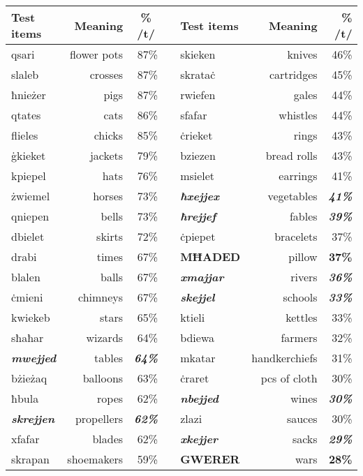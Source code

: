 \documentclass[output=paper]{langsci/langscibook}
\begin{document}
\begin{table}
\small
\begin{tabularx}{\textwidth}{lrr X lrr}
\lsptoprule
\textbf{Test items} & \textbf{Meaning} & \multicolumn{1}{c}{\textbf{\% /t/}} &  & \textbf{Test items} & \textbf{Meaning} & \textbf{\% /t/}\\
\midrule 
qsari & flower pots & 87\% &  & skieken & knives & 46\%\\
slaleb & crosses & 87\% &  & skrata\.c & cartridges & 45\%\\
ħnieżer & pigs & 87\% &  & rwiefen & gales & 44\%\\
qtates & cats & 86\% &  & sfafar & whistles & 44\%\\
flieles & chicks & 85\% &  & \.crieket & rings & 43\%\\
\.gkieket & jackets & 79\% &  & bziezen & bread rolls & 43\%\\
kpiepel & hats & 76\% &  & msielet & earrings & 41\%\\
żwiemel & horses & 73\% &  & \textbf{\textit{ħxejjex}} & vegetables & \textbf{\textit{41\%}}\\
qniepen & bells & 73\% &  & \textbf{\textit{ħrejjef}} & fables & \textbf{\textit{39\%}}\\
dbielet & skirts & 72\% &  & \.cpiepet & bracelets & 37\%\\
drabi & times & 67\% &  & \textbf{\textsc{MĦADED}} & pillow & \textbf{\textsc{37\%}}\\
blalen & balls & 67\% &  & \textbf{\textit{xmajjar}} & rivers & \textbf{\textit{36\%}}\\
\.cmieni & chimneys & 67\% &  & \textbf{\textit{skejjel}} & schools & \textbf{\textit{33\%}}\\
kwiekeb & stars & 65\% &  & ktieli & kettles & 33\%\\
sħaħar & wizards & 64\% &  & bdiewa & farmers & 32\%\\
\textbf{\textit{mwejjed}} & tables & \textbf{\textit{64\%}} &  & mkatar & handkerchiefs & 31\%\\
bżieżaq & balloons & 63\% &  & \.craret & pcs of cloth & 30\%\\
ħbula & ropes & 62\% &  & \textbf{\textit{nbejjed}} & wines & \textbf{\textit{30\%}}\\
\textbf{\textit{skrejjen}} & propellers & \textbf{\textit{62\%}} &  & zlazi & sauces & 30\%\\
xfafar & blades & 62\% &  & \textbf{\textit{xkejjer}} & sacks & \textbf{\textit{29\%}}\\
skrapan & shoemakers & 59\% &  & \textbf{\textsc{GWERER}} & wars & \textbf{\textsc{28\%}}\\

\end{tabularx}
\end{table}
\end{document}
